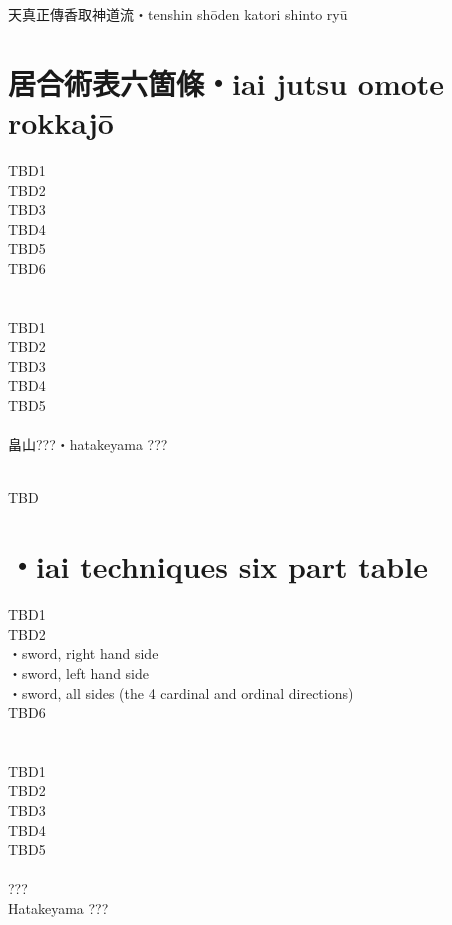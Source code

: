 \documentclass[dvipdfmx, a4paper, 12pt]{utarticle}
\begin{document}
\begin{CJK*}{UTF8}{min}
\begin{landscape}
\setcounter{section}{0}
\newpage
\pagestyle{empty}
天真正傳香取神道流・tenshin sh\={o}den katori shinto ry\={u}
\section{居合術表六箇條・iai jutsu omote rokkaj\={o}}
\noindent TBD1\\
TBD2\\
TBD3\\
TBD4\\
TBD5\\
TBD6\\
\section{}
\noindent TBD1\\
TBD2\\
TBD3\\
TBD4\\
TBD5\\
\\
畠山???・hatakeyama ???

\setcounter{section}{0}
\newpage
\pagestyle{empty}
\\
TBD
\section{・iai techniques six part table}
\noindent TBD1\\
TBD2\\
・sword, right hand side\\
・sword, left hand side\\
・sword, all sides (the 4 cardinal and ordinal directions)\\
TBD6\\
\section{}
\noindent TBD1\\
TBD2\\
TBD3\\
TBD4\\
TBD5\\
\\
???\\
Hatakeyama ???


\end{landscape}
\end{CJK*}
\end{document}
